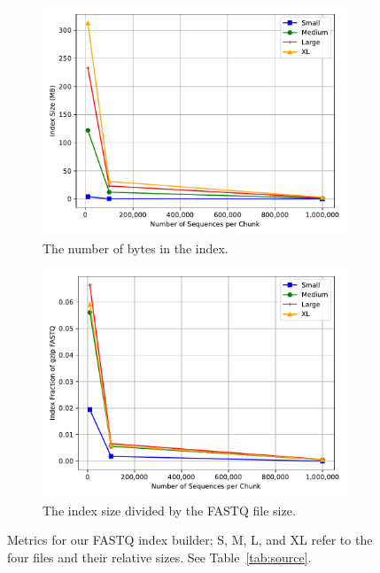 \begin{figure}
\begin{subfigure}[c]{.48\textwidth}
        \includegraphics[width=\linewidth]{figs/index-bytes.pdf}
        \caption{The number of bytes in the index.}
        \label{fig:bytes}
    \end{subfigure}%
    \begin{subfigure}[c]{.48\textwidth}
        \includegraphics[width=\linewidth]{figs/index-frac.pdf}
        \caption{The index size divided by the \gzip FASTQ file size.}
        \label{fig:frac}
    \end{subfigure}%
    \caption{Metrics for our \gzip FASTQ index builder; S, M, L, and XL refer to
    the four \gzip files and their relative sizes. See Table~\ref{tab:source}.}
    \label{fig:builder}
\end{figure}

